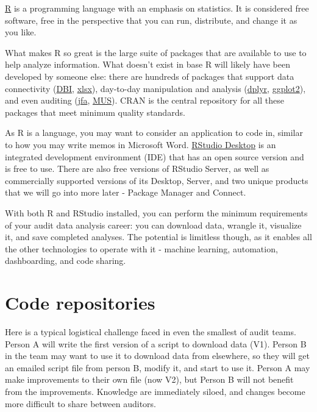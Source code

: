 \documentclass[
]{book}
\begin{document}
\href{https://www.r-project.org}{R} is a programming language with an emphasis on statistics. It is considered free software, free in the perspective that you can run, distribute, and change it as you like.

What makes R so great is the large suite of packages that are available to use to help analyze information. What doesn't exist in base R will likely have been developed by someone else: there are hundreds of packages that support data connectivity (\href{https://cran.r-project.org/web/packages/DBI/}{DBI}, \href{https://cran.r-project.org/web/packages/xlsx/}{xlsx}), day-to-day manipulation and analysis (\href{https://cran.r-project.org/web/packages/dplyr/}{dplyr}, \href{https://cran.r-project.org/web/packages/ggplot2/}{ggplot2}), and even auditing (\href{https://cran.r-project.org/web/packages/jfa/}{jfa}, \href{https://cran.r-project.org/web/packages/MUS/}{MUS}). CRAN is the central repository for all these packages that meet minimum quality standards.

As R is a language, you may want to consider an application to code in, similar to how you may write memos in Microsoft Word. \href{https://rstudio.com}{RStudio Desktop} is an integrated development environment (IDE) that has an open source version and is free to use. There are also free versions of RStudio Server, as well as commercially supported versions of its Desktop, Server, and two unique products that we will go into more later - Package Manager and Connect.

With both R and RStudio installed, you can perform the minimum requirements of your audit data analysis career: you can download data, wrangle it, visualize it, and save completed analyses. The potential is limitless though, as it enables all the other technologies to operate with it - machine learning, automation, dashboarding, and code sharing.

\hypertarget{code-repositories}{%
\section{Code repositories}\label{code-repositories}}

Here is a typical logistical challenge faced in even the smallest of audit teams. Person A will write the first version of a script to download data (V1). Person B in the team may want to use it to download data from elsewhere, so they will get an emailed script file from person B, modify it, and start to use it. Person A may make improvements to their own file (now V2), but Person B will not benefit from the improvements. Knowledge are immediately siloed, and changes become more difficult to share between auditors.
\end{document}
